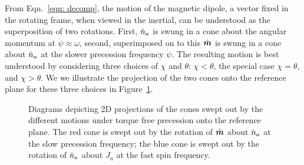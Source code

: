 \documentclass[../full_thesis/full_thesis.tex]{subfiles}
\begin{document}
From Eqn.~\eqref{eqn: decomp}, the motion of the magnetic dipole, a vector
fixed in the rotating frame, when viewed in the inertial, can be understood as
the superposition of two rotations. First, $\hat{n}_a$ is swung in a cone about the
angular momentum at $\dot{\psi} \approx \omega$, second, superimposed on to
this $\hat{\boldsymbol{m}}$ is swung in a cone about $\hat{n}_a$ at the slower precession frequency
$\dot{\psi}$. The resulting motion is best understood by considering three
choices of $\chi$ and $\theta$: $\chi < \theta$, the special case $\chi =
\theta$, and $\chi > \theta$. We we illustrate the projection of the two
cones onto the reference plane for these three choices in Figure~\ref{fig: cones}.
\begin{figure}[ht]
\centering
\caption{Diagrams depicting 2D projections of the cones swept out by the
    different motions under torque free precession onto the reference plane.
    The red cone is swept out by the rotation of $\hat{\boldsymbol{m}}$ about $\hat{n}_{a}$ at the
    slow precession frequency; the blue cone is swept out by the rotation of
    $\hat{n}_{a}$ about $J_a$ at the fast spin frequency.}
\label{fig: cones}
\end{figure}
\end{document}
